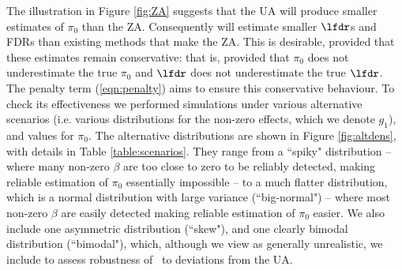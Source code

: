 The illustration in Figure \ref{fig:ZA} suggests that the UA will produce smaller estimates of $\pi_0$ than the ZA.
Consequently \ashr will estimate smaller $\lfdr$s and FDRs than existing methods that make the ZA. 
This is desirable, provided that these estimates remain conservative: that is,
provided that $\pi_0$ does not underestimate the true $\pi_0$ and $\lfdr$ does not underestimate the true $\lfdr$.
The penalty term (\ref{eqn:penalty}) aims to ensure this conservative behaviour. To check its effectiveness
we performed simulations under various alternative scenarios (i.e. various distributions for the non-zero effects, which we denote $g_1$), and values
for $\pi_0$. The alternative distributions are shown in Figure \ref{fig:altdens}, with details in Table \ref{table:scenarios}.
They range from a ``spiky" distribution -- where many non-zero $\beta$ are
too close to  zero to be reliably detected, making reliable estimation of $\pi_0$ essentially impossible -- to a much
flatter distribution, which is a normal distribution with large variance (``big-normal") -- where most non-zero $\beta$ are easily detected
making reliable estimation of $\pi_0$ easier. We also include one asymmetric distribution (``skew"), and one clearly bimodal distribution (``bimodal"),
which, although we view as generally unrealistic, we include to assess robustness of \ashr~to deviations from the UA.